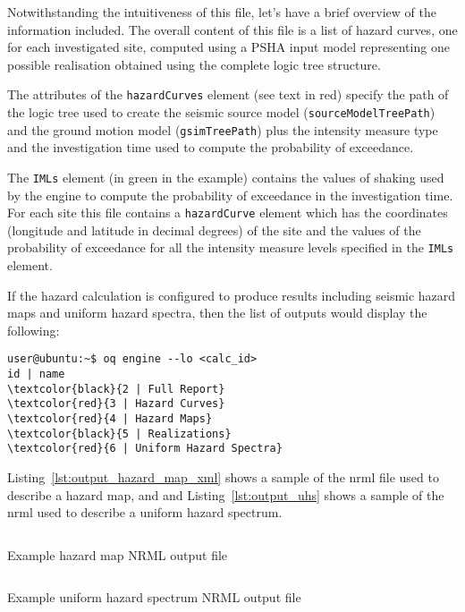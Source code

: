 Notwithstanding the intuitiveness of this file, let's have a brief overview of
the information included. The overall content of this file is a list of hazard
curves, one for each investigated site, computed using a PSHA input model
representing one possible realisation obtained using the complete logic tree
structure.

The attributes of the \texttt{hazardCurves} element (see text in red) specify
the path of the logic tree used to create the seismic source model
(\texttt{source\-Model\-TreePath}) and the ground motion model
(\texttt{gsim\-Tree\-Path}) plus the intensity measure type and the
investigation time used to compute the probability of exceedance.

The \texttt{IMLs} element (in green in the example) contains the values of
shaking used by the engine to compute the probability of exceedance in the
investigation time. For each site this file contains a \texttt{hazardCurve}
element which has the coordinates (longitude and latitude in decimal degrees)
of the site and the values of the probability of exceedance for all the
intensity measure levels specified in the \texttt{IMLs} element.

If the hazard calculation is configured to produce results including seismic
hazard maps and uniform hazard spectra, then the list of outputs would display
the following:

\begin{Verbatim}[frame=single, commandchars=\\\{\}, fontsize=\small]
user@ubuntu:~$ oq engine --lo <calc_id>
id | name
\textcolor{black}{2 | Full Report}
\textcolor{red}{3 | Hazard Curves}
\textcolor{red}{4 | Hazard Maps}
\textcolor{black}{5 | Realizations}
\textcolor{red}{6 | Uniform Hazard Spectra}
\end{Verbatim}

Listing~\ref{lst:output_hazard_map_xml} shows a sample of the nrml file
used to describe a hazard map, and and Listing~\ref{lst:output_uhs}
shows a sample of the nrml used to describe a uniform hazard spectrum.

\begin{listing}[htbp]
  \inputminted[firstline=1,firstnumber=1,fontsize=\footnotesize,frame=single,linenos,bgcolor=lightgray]{xml}{oqum/hazard/verbatim/output_hazard_map.xml}
  \caption{Example hazard map NRML output file}
  \label{lst:output_hazard_map_xml}
\end{listing}


\begin{listing}[htbp]
  \inputminted[firstline=1,firstnumber=1,fontsize=\footnotesize,frame=single,linenos,bgcolor=lightgray]{xml}{oqum/hazard/verbatim/output_uhs.xml}
  \caption{Example uniform hazard spectrum NRML output file}
  \label{lst:output_uhs}
\end{listing}

